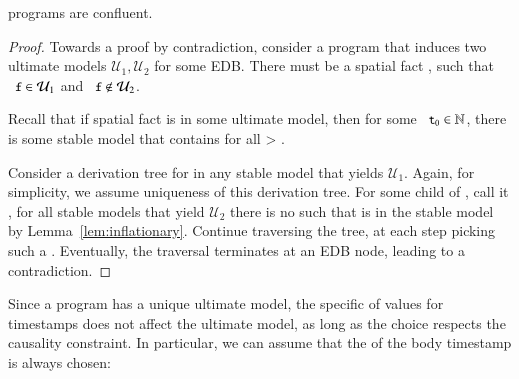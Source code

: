 \begin{theorem}
\label{thm:confluence}
\slang programs are confluent.
\end{theorem}
\begin{proof}

Towards a proof by contradiction, consider a \slang program that 
induces two ultimate models $\mathcal{U}_1, \mathcal{U}_2$ for some EDB.  There must be a spatial fact , such that 
$\dedalus{f} \in \mathcal{U}_1$ and $\dedalus{f} \not\in \mathcal{U}_2$.

Recall that if spatial fact  is in some ultimate model, then for some $\dedalus{t\sub{0}} \in \mathbb{N}$, there is some stable model that contains  for all  > .

Consider a derivation tree for  in any stable model that yields $\mathcal{U}_1$.  Again, for simplicity, we assume uniqueness of this derivation tree.  For some child of , call it , for all stable models that yield $\mathcal{U}_2$ there is no  such that  is in the stable model by Lemma~\ref{lem:inflationary}.  Continue traversing the tree, at each step picking such a .  Eventually, the traversal terminates at an EDB node, leading to a contradiction.
\end{proof}

Since a \slang program has a unique ultimate model, the specific  of values for timestamps does not affect the ultimate model, as long as the choice respects the causality constraint.  In particular, we can assume that the  of the body timestamp is always chosen:

